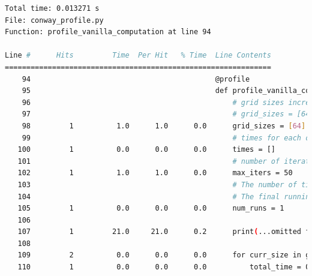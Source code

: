 \documentclass[a4paper,12pt]{article}
\begin{document}
\begin{lstlisting}[language=bash,basicstyle=\tiny\ttfamily]
Total time: 0.013271 s
File: conway_profile.py
Function: profile_vanilla_computation at line 94

Line #      Hits         Time  Per Hit   % Time  Line Contents
==============================================================
    94                                           @profile                                                                                        
    95                                           def profile_vanilla_computation(update_method_key):                                             
    96                                               # grid sizes increase by powers of 2                                                        
    97                                               # grid_sizes = [64, 128, 256, 512, 1024]                                                    
    98         1          1.0      1.0      0.0      grid_sizes = [64]                                                                           
    99                                               # times for each of the computations (in seconds)                                           
   100         1          0.0      0.0      0.0      times = []                                                                                  
   101                                               # number of iterations for which the updates will happen                                    
   102         1          1.0      1.0      0.0      max_iters = 50                                                                              
   103                                               # The number of times the run will be performed for each grid size.                         
   104                                               # The final running time reported will be the average of these runs                         
   105         1          0.0      0.0      0.0      num_runs = 1                                                                                
   106                                                                                                                                           
   107         1         21.0     21.0      0.2      print(...omitted for space...)
   108                                                                                                                                           
   109         2          0.0      0.0      0.0      for curr_size in grid_sizes:                                                                
   110         1          0.0      0.0      0.0          total_time = 0                                                                          

\end{lstlisting}
\end{document}
